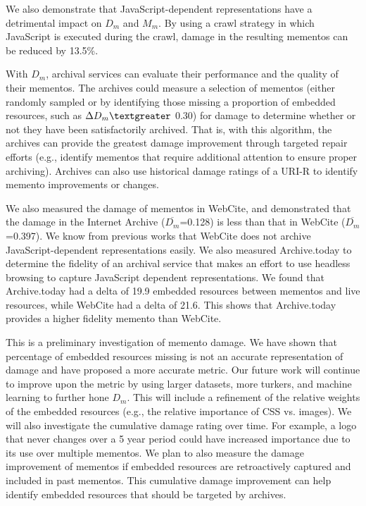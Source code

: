 We also demonstrate that JavaScript-dependent representations have a detrimental impact on $D_m$ and $M_m$. By using a crawl strategy in which JavaScript is executed during the crawl, damage in the resulting mementos can be reduced by 13.5\%.

With $D_m$, archival services can evaluate their performance and the quality of their mementos. The archives could measure a selection of mementos (either randomly sampled or by identifying those missing a proportion of embedded resources, such as {$\Delta D_m \textgreater$} 0.30) for damage to determine whether or not they have been satisfactorily archived. That is, with this algorithm, the archives can provide the greatest damage improvement through targeted repair efforts (e.g., identify mementos that require additional attention to ensure proper archiving). Archives can also use historical damage ratings of a URI-R to identify memento improvements or changes.

We also measured the damage of mementos in WebCite, and demonstrated that the damage in the Internet Archive ($\overline{D_m}$=0.128) is less than that in WebCite ($\overline{D_m}$=0.397). We know from previous works that WebCite does not archive JavaScript-dependent representations easily. We also measured Archive.today to determine the fidelity of an archival service that makes an effort to use headless browsing to capture JavaScript dependent representations. We found that Archive.today had a delta of 19.9 embedded resources between mementos and live resources, while WebCite had a delta of 21.6. This shows that Archive.today provides a higher fidelity memento than WebCite.

This is a preliminary investigation of memento damage. We have shown that percentage of embedded resources missing is not an accurate representation of damage and have proposed a more accurate metric.  Our future work will continue to improve upon the metric by using larger datasets, more turkers, and machine learning to further hone $D_m$. This will include a refinement of the relative weights of the embedded resources (e.g., the relative importance of CSS vs. images). We will also investigate the cumulative damage rating over time. For example, a logo that never changes over a 5 year period could have increased importance due to its use over multiple mementos. We plan to also measure the damage improvement of mementos if embedded resources are retroactively captured and included in past mementos. This cumulative damage improvement can help identify embedded resources that should be targeted by archives.


